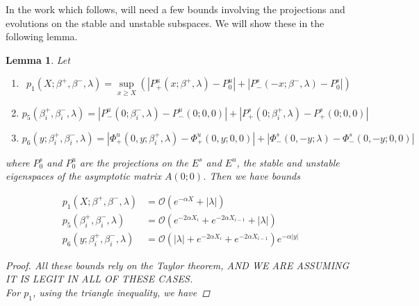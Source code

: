 \documentclass[12pt]{article}
\newtheorem{lemma}{Lemma}
\begin{document}
In the work which follows, will need a few bounds involving the projections and evolutions on the stable and unstable subspaces. We will show these in the following lemma.


\begin{lemma}\label{projbounds}
Let

\begin{enumerate}
\item
\begin{equation}\label{p1}
p_1(X; \beta^+, \beta^-, \lambda) = \sup_{x \geq X} (|P^u_+(x; \beta^+, \lambda) - P_0^u| + |P^s_-(-x; \beta^-, \lambda) - P_0^s|)
\end{equation}
\item
\begin{equation}\label{p5}
p_5(\beta_i^+, \beta_i^-, \lambda) = |P^u_-(0; \beta_i^-, \lambda) - P^u_-(0; 0, 0)| + |P^s_+(0; \beta_i^+, \lambda) - P^s_+(0; 0, 0)|
\end{equation}
\item 
\begin{equation}\label{p6}
p_6(y; \beta_i^+, \beta_i^-, \lambda) = |\Phi^u_+(0, y; \beta_i^+, \lambda) - \Phi^u_+(0, y; 0, 0)| + |\Phi^s_-(0, -y; \lambda) - \Phi^s_-(0, -y; 0, 0)| 
\end{equation}

\end{enumerate}

where $P_0^s$ and $P_0^u$ are the projections on the $E^s$ and $E^u$, the stable and unstable eigenspaces of the asymptotic matrix $A(0; 0)$. Then we have bounds

\begin{align}
p_1(X; \beta^+, \beta^-, \lambda) &= \mathcal{O}( e^{-\alpha X } + |\lambda| ) \\
p_5(\beta_i^+, \beta_i^-, \lambda) &= \mathcal{O}(e^{-2 \alpha X_i} + e^{-2 \alpha X_{i-1}} + |\lambda|) \\
p_6(y; \beta_i^+, \beta_i^-, \lambda) &= \mathcal{O}(|\lambda| + e^{-2 \alpha X_i} + e^{-2 \alpha X_{i-1}} ) e^{-\alpha |y|}
\end{align}

\begin{proof}
All these bounds rely on the Taylor theorem, AND WE ARE ASSUMING IT IS LEGIT IN ALL OF THESE CASES.\\

For $p_1$, using the triangle inequality, we have


\end{proof}
\end{lemma}
\end{document}
